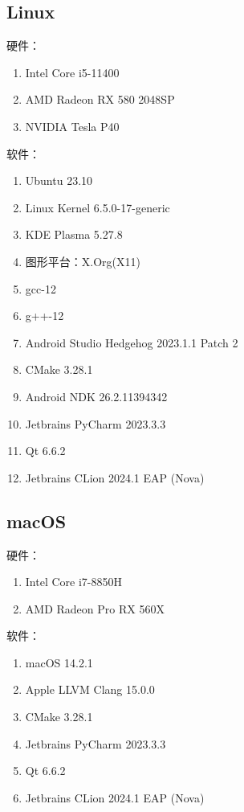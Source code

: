 \subsection{Linux}

硬件：
\begin{enumerate}
	\item Intel Core i5-11400
	\item AMD Radeon RX 580 2048SP
	\item NVIDIA Tesla P40
\end{enumerate}

软件：
\begin{enumerate}
	\item Ubuntu 23.10
	\item Linux Kernel 6.5.0-17-generic
	\item KDE Plasma 5.27.8
	\item 图形平台：X.Org(X11)
	\item gcc-12
	\item g++-12
	\item Android Studio Hedgehog 2023.1.1 Patch 2
	\item CMake 3.28.1
	\item Android NDK 26.2.11394342
	\item Jetbrains PyCharm 2023.3.3
	\item Qt 6.6.2
	\item Jetbrains CLion 2024.1 EAP (Nova)
\end{enumerate}

\subsection{macOS}

硬件：
\begin{enumerate}
	\item Intel Core i7-8850H
	\item AMD Radeon Pro RX 560X
\end{enumerate}

软件：
\begin{enumerate}
	\item macOS 14.2.1
	\item Apple LLVM Clang 15.0.0
	\item CMake 3.28.1
	\item Jetbrains PyCharm 2023.3.3
	\item Qt 6.6.2
	\item Jetbrains CLion 2024.1 EAP (Nova)
\end{enumerate}
